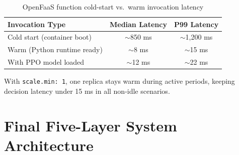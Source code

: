 \begin{table}[H]
\centering
\caption{OpenFaaS function cold-start vs.\ warm invocation latency}
\label{tab:faas_latency}
\begin{tabular}{lcc}
\toprule
\textbf{Invocation Type} & \textbf{Median Latency} & \textbf{P99 Latency} \\
\midrule
Cold start (container boot) & $\sim$850 ms & $\sim$1,200 ms \\
Warm (Python runtime ready) & $\sim$8 ms   & $\sim$15 ms    \\
With PPO model loaded       & $\sim$12 ms  & $\sim$22 ms    \\
\bottomrule
\end{tabular}
\end{table}

\noindent With \texttt{scale.min: 1}, one replica stays warm during active periods,
keeping decision latency under 15 ms in all non-idle scenarios.

\section{Final Five-Layer System Architecture}
\label{sec:final_arch}

